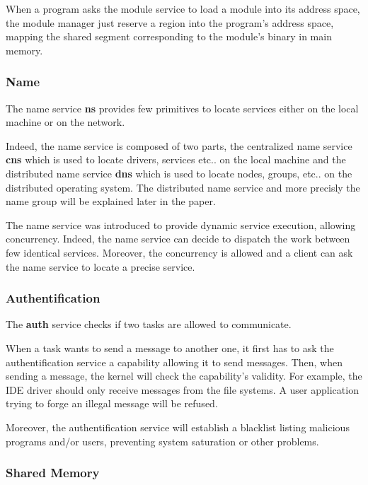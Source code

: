 \documentclass[10pt,a4wide]{article}
\begin{document}
\begin{multicols}{2}
When a program asks the module service to load a module into its address
space, the module manager just reserve a region into the program's address
space, mapping the shared segment corresponding to the module's binary in
main memory.

\subsubsection{Name}

The name service \textbf{ns} provides few primitives to locate services
either on the local machine or on the network.

Indeed, the name service is composed of two parts, the centralized name
service \textbf{cns} which is used to locate drivers, services etc.. on
the local machine and the distributed name service \textbf{dns} which is
used to locate nodes, groups, etc.. on the distributed operating system.
The distributed name service and more precisly the name group will be
explained later in the paper.

The name service was introduced to provide dynamic service execution, allowing
concurrency. Indeed, the name service can decide to dispatch the work between
few identical services. Moreover, the concurrency is allowed and a client
can ask the name service to locate a precise service.

\subsubsection{Authentification}

The \textbf{auth} service checks if two tasks are allowed to communicate.

When a task wants to send a message to another one, it first has to ask
the authentification service a capability allowing it to send messages. Then,
when sending a message, the kernel will check the capability's validity.
For example, the IDE driver should only receive messages from the file systems.
A user application trying to forge an illegal message will be refused.

Moreover, the authentification service will establish a blacklist listing
malicious programs and/or users, preventing system saturation or other
problems.

\subsubsection{Shared Memory}


\end{multicols}
\end{document}
